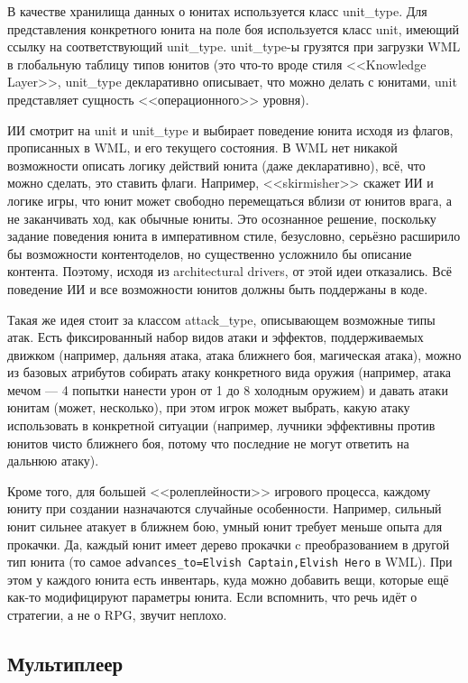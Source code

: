\documentclass[a5paper]{article}
\begin{document}
В качестве хранилища данных о юнитах используется класс unit\_type. Для представления конкретного юнита на поле боя используется класс unit, имеющий ссылку на соответствующий unit\_type. unit\_type-ы грузятся при загрузки WML в глобальную таблицу типов юнитов (это что-то вроде стиля <<Knowledge Layer>>, unit\_type декларативно описывает, что можно делать с юнитами, unit представляет сущность <<операционного>> уровня). 

ИИ смотрит на unit и unit\_type и выбирает поведение юнита исходя из флагов, прописанных в WML, и его текущего состояния. В WML нет никакой возможности описать логику действий юнита (даже декларативно), всё, что можно сделать, это ставить флаги. Например, <<skirmisher>> скажет ИИ и логике игры, что юнит может свободно перемещаться вблизи от юнитов врага, а не заканчивать ход, как обычные юниты. Это осознанное решение, поскольку задание поведения юнита в императивном стиле, безусловно, серьёзно расширило бы возможности контентоделов, но существенно усложнило бы описание контента. Поэтому, исходя из architectural drivers, от этой идеи отказались. Всё поведение ИИ и все возможности юнитов должны быть поддержаны в коде.

Такая же идея стоит за классом attack\_type, описывающем возможные типы атак. Есть фиксированный набор видов атаки и эффектов, поддерживаемых движком (например, дальняя атака, атака ближнего боя, магическая атака), можно из базовых атрибутов собирать атаку конкретного вида оружия (например, атака мечом --- 4 попытки нанести урон от 1 до 8 холодным оружием) и давать атаки юнитам (может, несколько), при этом игрок может выбрать, какую атаку использовать в конкретной ситуации (например, лучники эффективны против юнитов чисто ближнего боя, потому что последние не могут ответить на дальнюю атаку).

Кроме того, для большей <<ролеплейности>> игрового процесса, каждому юниту при создании назначаются случайные особенности. Например, сильный юнит сильнее атакует в ближнем бою, умный юнит требует меньше опыта для прокачки. Да, каждый юнит имеет дерево прокачки c преобразованием в другой тип юнита (то самое \texttt{advances_to=Elvish Captain,Elvish Hero} в WML). При этом у каждого юнита есть инвентарь, куда можно добавить вещи, которые ещё как-то модифицируют параметры юнита. Если вспомнить, что речь идёт о стратегии, а не о RPG, звучит неплохо.

\subsection{Мультиплеер}
\end{document}
